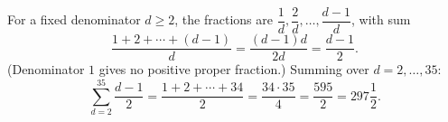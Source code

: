 For a fixed denominator $d\ge2$, the fractions are $\dfrac{1}{d},\dfrac{2}{d},\dots,\dfrac{d-1}{d}$, with sum
\[
\dfrac{1+2+\cdots+(d-1)}{d}=\dfrac{(d-1)d}{2d}=\dfrac{d-1}{2}.
\]
(Denominator $1$ gives no positive proper fraction.) Summing over $d=2,\dots,35$:
\[
\sum_{d=2}^{35}\dfrac{d-1}{2}=\dfrac{1+2+\cdots+34}{2}=\dfrac{34\cdot35}{4}=\dfrac{595}{2}=\boxed{297\dfrac{1}{2}}.
\]
